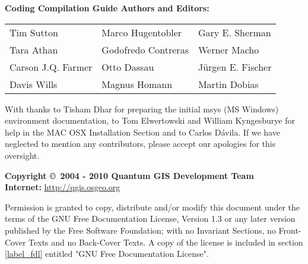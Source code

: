 \begin{flushleft}
\textbf{Coding Compilation Guide Authors and Editors:}
 
\begin{tabular}{p{5cm} p{5cm} p{5cm}}
Tim Sutton & Marco Hugentobler & Gary E. Sherman \\
Tara Athan & Godofredo Contreras & Werner Macho \\
Carson J.Q. Farmer & Otto Dassau & J\"urgen E. Fischer \\
Davis Wills & Magnus Homann & Martin Dobias \\ 
\end{tabular}

With thanks to Tisham Dhar for preparing the initial msys (MS Windows)
environment documentation, to Tom Elwertowski and William Kyngesburye for
help in the MAC OSX Installation Section and to Carlos D\'{a}vila. If we have
neglected to mention any contributors, please accept our apologies for this
oversight.

\vspace{0.5cm}

\textbf{Copyright \copyright~2004 - 2010 Quantum GIS Development Team} \\
\textbf{Internet:} \url{http://qgis.osgeo.org}
\end{flushleft}

\newpage


Permission is granted to copy, distribute and/or modify this document under
the terms of the GNU Free Documentation License, Version 1.3 or any later
version published by the Free Software Foundation; with no Invariant
Sections, no Front-Cover Texts and no Back-Cover Texts.  A copy of the
license is included in section \ref{label_fdl} entitled "GNU Free Documentation
License".

